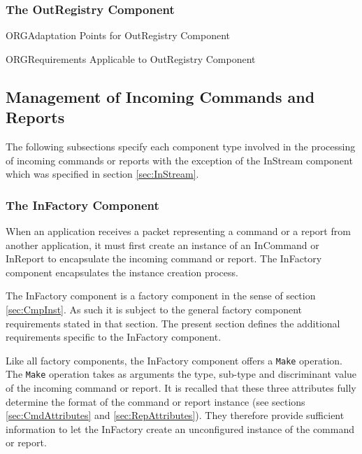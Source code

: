 \documentclass[a4paper,10pt]{article}
\newenvironment{cr_req}[2]
{%
\begin{longtable}{|l|p{9.8cm}|}
\caption{#2} \\
\hline
\rowcolor{light-gray}
\textbf{Req. ID} & \textbf{Requirement Text}\\
\hline\hline
\endfirsthead
\rowcolor{light-gray}
\textbf{Req. ID} & \textbf{Requirement Text}\\
\hline\hline
\endhead
\DTLforeach*[\DTLiseq{\cat}{#1}]{dbReq}{\cat=Category,\type=Type,\id=Id,\reqText=Text}
{\DTLiffirstrow{}{\\\hline}\cat-\id/\type & \textit{\reqText}}\\\hline
}
{\end{longtable}}
\newenvironment{cr_ap}[2]
{%
\begin{longtable}{|l|p{4.7cm}|p{4.9cm}|}
\caption{#2} \\
\hline
\rowcolor{light-gray}
\textbf{AP ID} & \textbf{Adaptation Point} & \textbf{Default Value}\\
\hline\hline
\endfirsthead
\rowcolor{light-gray}
\textbf{AP ID} & \textbf{Adaptation Point} & \textbf{Default Value}\\
\hline\hline
\endhead
\DTLforeach*[\DTLiseq{\cat}{#1}]{dbAP}{\cat=Category,\id=Id,\ap=AP,\defValue=DefValue}
{\DTLiffirstrow{}{\\\hline}\cat-\id & \ap & \defValue}\\\hline
}
{\end{longtable}}
\begin{document}
\subsubsection{The OutRegistry Component}\label{sec:OutRegistry}


\begin{cr_ap}{ORG}{Adaptation Points for OutRegistry Component}
\end{cr_ap}

\begin{cr_req}{ORG}{Requirements Applicable to OutRegistry Component}
\end{cr_req}

\subsection{Management of Incoming Commands and Reports}\label{sec:ManagementOfIncomingCmdAndRep}


The following subsections specify each component type involved in the processing of incoming commands or reports with the exception of the InStream component which was specified in section \ref{sec:InStream}. 

\subsubsection{The InFactory Component}\label{sec:InFactory}

When an application receives a packet representing a command or a report from another application, it must first create an instance of an InCommand or InReport to encapsulate the incoming command or report. The InFactory component encapsulates the instance creation process.

The InFactory component is a factory component in the sense of section \ref{sec:CmpInst}. As such it is subject to the general factory component requirements stated in that section. The present section defines the additional requirements specific to the InFactory component.

Like all factory components, the InFactory component offers a \texttt{Make} operation. The \texttt{Make} operation takes as arguments the type, sub-type and discriminant value of the incoming command or report. It is recalled that these three attributes fully determine the format of the command or report instance (see sections \ref{sec:CmdAttributes} and \ref{sec:RepAttributes}). They therefore provide sufficient information to let the InFactory create an unconfigured instance of the command or report.
\end{document}
